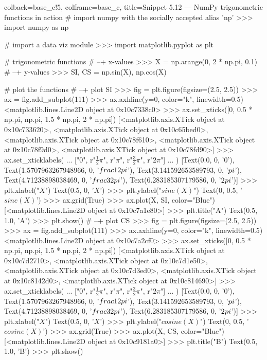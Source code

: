 \documentclass[a4paper,11pt]{book}
\begin{document}
\begin{pythoncode}[linenos=true,]{colback=base_c!5, colframe=base_c, title=\sffamily Snippet 5.12 --- NumPy trigonometric functions in action}
# import numpy with the socially accepted alias 'np'
>>> import numpy as np

# import a data viz module
>>> import matplotlib.pyplot as plt

# trigonometric functions
# --+ x-values
>>> X = np.arange(0, 2 * np.pi, 0.1)
# --+ y-values
>>> SI, CS = np.sin(X), np.cos(X)

# plot the functions
# --+ plot SI
>>> fig = plt.figure(figsize=(2.5, 2.5))
>>> ax = fig.add_subplot(111)
>>> ax.axhline(y=0, color="k", linewidth=0.5)
<matplotlib.lines.Line2D object at 0x10c7338c0>
>>> ax.set_xticks([0, 0.5 * np.pi, np.pi, 1.5 * np.pi, 2 * np.pi])
[<matplotlib.axis.XTick object at 0x10c733620>, <matplotlib.axis.XTick object at 0x10c65bed0>, <matplotlib.axis.XTick object at 0x10c78f610>, <matplotlib.axis.XTick object at 0x10c78f9d0>, <matplotlib.axis.XTick object at 0x10c78fd90>]
>>> ax.set_xticklabels(
...     ["0", r"$\frac{1}{2} \pi$", r"$\pi$", r"$\frac{3}{2} \pi$", r"$2 \pi$"]
... )
[Text(0.0, 0, '0'), Text(1.5707963267948966, 0, '$\\frac{1}{2} \\pi$'), Text(3.141592653589793, 0, '$\\pi$'), Text(4.71238898038469, 0, '$\\frac{3}{2} \\pi$'), Text(6.283185307179586, 0, '$2 \\pi$')]
>>> plt.xlabel("$X$")
Text(0.5, 0, '$X$')
>>> plt.ylabel("$sine(X)$")
Text(0, 0.5, '$sine(X)$')
>>> ax.grid(True)
>>> ax.plot(X, SI, color="Blue")
[<matplotlib.lines.Line2D object at 0x10c7a1e80>]
>>> plt.title("A")
Text(0.5, 1.0, 'A')
>>> plt.show()
# --+ plot CS
>>> fig = plt.figure(figsize=(2.5, 2.5))
>>> ax = fig.add_subplot(111)
>>> ax.axhline(y=0, color="k", linewidth=0.5)
<matplotlib.lines.Line2D object at 0x10c7a2cf0>
>>> ax.set_xticks([0, 0.5 * np.pi, np.pi, 1.5 * np.pi, 2 * np.pi])
[<matplotlib.axis.XTick object at 0x10c7d2710>, <matplotlib.axis.XTick object at 0x10c7d1e50>, <matplotlib.axis.XTick object at 0x10c7d3ed0>, <matplotlib.axis.XTick object at 0x10c8142d0>, <matplotlib.axis.XTick object at 0x10c814690>]
>>> ax.set_xticklabels(
...     ["0", r"$\frac{1}{2} \pi$", r"$\pi$", r"$\frac{3}{2} \pi$", r"$2 \pi$"]
... )
[Text(0.0, 0, '0'), Text(1.5707963267948966, 0, '$\\frac{1}{2} \\pi$'), Text(3.141592653589793, 0, '$\\pi$'), Text(4.71238898038469, 0, '$\\frac{3}{2} \\pi$'), Text(6.283185307179586, 0, '$2 \\pi$')]
>>> plt.xlabel("$X$")
Text(0.5, 0, '$X$')
>>> plt.ylabel("$cosine(X)$")
Text(0, 0.5, '$cosine(X)$')
>>> ax.grid(True)
>>> ax.plot(X, CS, color="Blue")
[<matplotlib.lines.Line2D object at 0x10c9181a0>]
>>> plt.title("B")
Text(0.5, 1.0, 'B')
>>> plt.show()
\end{pythoncode}
\end{document}
